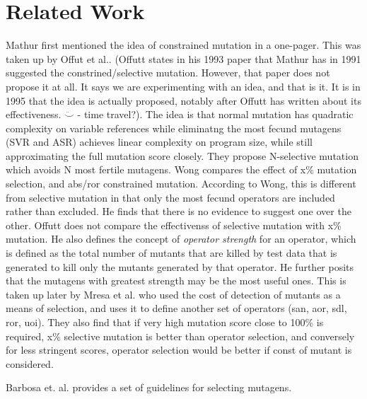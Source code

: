 \section{Related Work}
\label{sec:related}
Mathur\cite{mathur1991performance, wong1993mutation, wong1995reducing} first mentioned the idea of constrained mutation in a one-pager. This was taken up by Offut et al.\cite{offutt1993experimental}. (Offutt states in his 1993 paper\cite{offutt1993experimental} that Mathur has in 1991\cite{mathur1991performance} suggested the constrined/selective mutation. However, that paper does not propose it at all. It says we are experimenting with an idea, and that is it. It is in 1995\cite{wong1995reducing} that the idea is actually proposed, notably after Offutt has written about its effectiveness. $\ddot\smile$ - time travel?). The idea is that normal mutation has quadratic complexity on variable references while eliminatng the most fecund mutagens (SVR and ASR) achieves linear complexity on program size, while still approximating the full mutation score closely. They propose N-selective mutation which avoids N most fertile mutagens. Wong \cite{wong1995reducing} compares the effect of x\% mutation selection, and abs/ror constrained mutation. According to Wong, this is different from selective mutation in that only the most fecund operators are included rather than excluded. He finds that there is no evidence to suggest one over the other. Offutt\cite{offutt1993experimental} does not compare the effectivenss of selective mutation with x\% mutation. He also defines the concept of {\it operator strength} for an operator, which is defined as the total number of mutants that are killed by test data that is generated to kill only the mutants generated by that operator. He further posits that the mutagens with greatest strength may be the most useful ones. %
This is taken up later by Mresa\cite{mresa1999efficiency} et al. who used the cost of detection of mutants as a means of selection, and uses it to define another set of operators (san, aor, sdl, ror, uoi). They also find that if very high mutation score close to 100\% is required, x\% selective mutation is better than operator selection, and conversely for less stringent scores, operator selection would be better if const of mutant is considered.

Barbosa et. al.\cite{barbosa2001toward} provides a set of guidelines for selecting mutagens.

